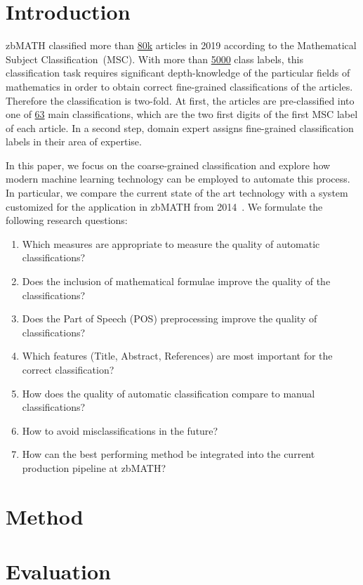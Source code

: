 \section{Introduction}\label{sec:intro}
zbMATH classified more than 
\href{https://zbmath.org/?q=%2A+py%3A2019}%
{80k} articles in 2019 according to the Mathematical Subject Classification~(MSC).
With more than
\href{https://msc2020.org}%
{5000} class labels, this classification task requires significant depth-knowledge of the particular fields of mathematics in order to obtain correct fine-grained classifications of the articles.
Therefore the classification is two-fold.
At first, the articles are pre-classified into one of \href{https://msc2020.org}%
{63} main classifications, which are the two first digits of the first MSC label of each article.
In a second step, domain expert assigns fine-grained classification labels in their area of expertise.

In this paper, we focus on the coarse-grained classification and explore how modern machine learning technology can be employed to automate this process.
In particular, we compare the current state of the art technology with a system customized for the application in zbMATH from 2014~\cite{SchonebergS14}. 
We formulate the following research questions:
\begin{enumerate}
  \item Which measures are appropriate to measure the quality of automatic classifications?
  \item Does the inclusion of mathematical formulae improve the quality of the classifications?
  \item Does the Part of Speech (POS) preprocessing improve the quality of classifications?
  \item Which features (Title, Abstract, References) are most important for the correct classification?
  \item How does the quality of automatic classification compare to manual classifications?
  \item How to avoid misclassifications in the future?
  \item How can the best performing method be integrated into the current production pipeline at zbMATH?
\end{enumerate}
\section{Method}\label{sec:method}

\section{Evaluation}\label{sec:eval}

